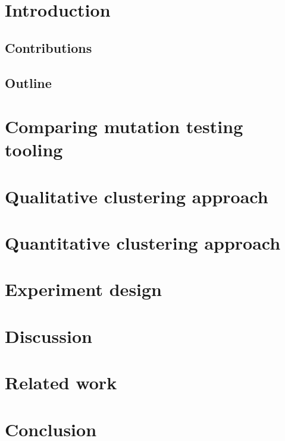 \documentclass[conference]{IEEEtran}
\begin{document}
\begin{IEEEkeywords}

\end{IEEEkeywords}

\section{Introduction}
\subsection{Contributions}
\subsection{Outline}


\section{Comparing mutation testing tooling}
\section{Qualitative clustering approach}
\section{Quantitative clustering approach}
\section{Experiment design}



\section{Discussion}

\section{Related work}
\label{sec:rw}

\section{Conclusion}
\label{sec:conclusion}

\printbibliography[heading=bibintoc]
\end{document}

